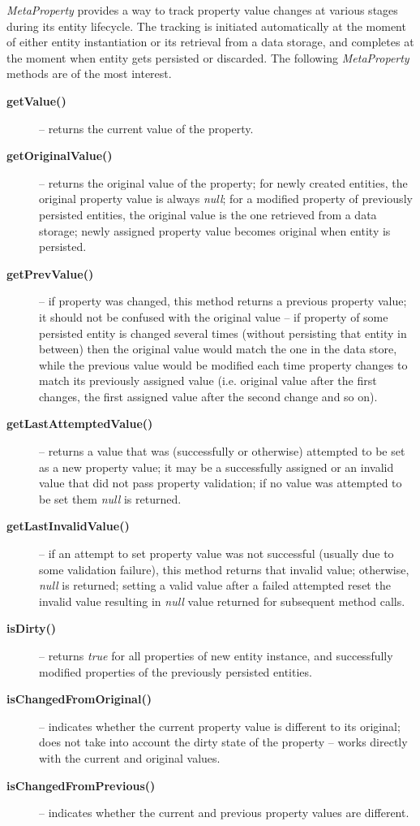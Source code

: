   \emph{MetaProperty} provides a way to track property value changes at various stages during its entity lifecycle.
  The tracking is initiated automatically at the moment of either entity instantiation or its retrieval from a data storage, and completes at the moment when entity gets persisted or discarded.
  The following \emph{MetaProperty} methods are of the most interest.
  \begin{description}
    \item[\textbf{getValue()}] -- returns the current value of the property.
    \item[\textbf{getOriginalValue()}] -- returns the original value of the property; for newly created entities, the original property value is always \emph{null}; for a modified property of previously persisted entities, the original value is the one retrieved from a data storage; newly assigned property value becomes original when entity is persisted.
    \item[\textbf{getPrevValue()}] -- if property was changed, this method returns a previous property value; it should not be confused with the original value -- if property of some persisted entity is changed several times (without persisting that entity in between) then the original value would match the one in the data store, while the previous value would be modified each time property changes to match its previously assigned value (i.e. original value after the first changes, the first assigned value after the second change and so on).
    \item[\textbf{getLastAttemptedValue()}] -- returns a value that was (successfully or otherwise) attempted to be set as a new property value; it may be a successfully assigned or an invalid value that did not pass property validation; if no value was attempted to be set them \emph{null} is returned.
    \item[\textbf{getLastInvalidValue()}] -- if an attempt to set property value was not successful (usually due to some validation failure), this method returns that invalid value; otherwise, \emph{null} is returned; setting a valid value after a failed attempted reset the invalid value resulting in \emph{null} value returned for subsequent method calls.
    \item[\textbf{isDirty()}] -- returns \emph{true} for all properties of new entity instance, and successfully modified properties of the previously persisted entities.
    \item[\textbf{isChangedFromOriginal()}] -- indicates whether the current property value is different to its original; does not take into account the dirty state of the property -- works directly with the current and original values.
    \item[\textbf{isChangedFromPrevious()}] -- indicates whether the current and previous property values are different.
  \end{description}  
  
